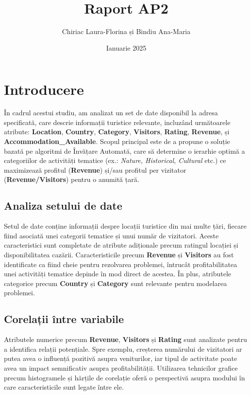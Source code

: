 \documentclass{article}
\title{Raport AP2}
\author{Chiriac Laura-Florina și Bindiu Ana-Maria }
\date{Ianuarie 2025}
\begin{document}
\maketitle

\section*{Introducere}

În cadrul acestui studiu, am analizat un set de date disponibil la adresa specificată, care descrie informații turistice relevante, incluzând următoarele atribute: \textbf{Location}, \textbf{Country}, \textbf{Category}, \textbf{Visitors}, \textbf{Rating}, \textbf{Revenue}, și \textbf{Accommodation\_Available}. Scopul principal este de a propune o soluție bazată pe algoritmi de Învățare Automată, care să determine o ierarhie optimă a categoriilor de activități tematice (ex.: \textit{Nature, Historical, Cultural} etc.) ce maximizează profitul (\textbf{Revenue}) și/sau profitul per vizitator (\textbf{Revenue/Visitors}) pentru o anumită țară.

\subsection*{Analiza setului de date}
Setul de date conține informații despre locații turistice din mai multe țări, fiecare fiind asociată unei categorii tematice și unui număr de vizitatori. Aceste caracteristici sunt completate de atribute adiționale precum ratingul locației și disponibilitatea cazării. Caracteristicile precum \textbf{Revenue} și \textbf{Visitors} au fost identificate ca fiind cheie pentru rezolvarea problemei, întrucât profitabilitatea unei activități tematice depinde în mod direct de acestea. În plus, atributele categorice precum \textbf{Country} și \textbf{Category} sunt relevante pentru modelarea problemei.

\subsection*{Corelații între variabile}
Atributele numerice precum \textbf{Revenue}, \textbf{Visitors} și \textbf{Rating} sunt analizate pentru a identifica relații potențiale. Spre exemplu, creșterea numărului de vizitatori ar putea avea o influență pozitivă asupra veniturilor, iar tipul de activitate poate avea un impact semnificativ asupra profitabilității. Utilizarea tehnicilor grafice precum histogramele și hărțile de corelație oferă o perspectivă asupra modului în care caracteristicile sunt legate între ele.
\end{document}
